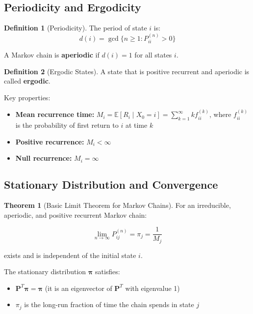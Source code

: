 \documentclass[12pt,a4paper]{article}
\theoremstyle{definition}
\newtheorem{definition}{Definition}[section]
\newtheorem{theorem}{Theorem}[section]
\begin{document}
\subsection{Periodicity and Ergodicity}

\begin{definition}[Periodicity]
The period of state $i$ is:
\[
d(i) = \gcd\{n \geq 1 : P_{ii}^{(n)} > 0\}
\]

A Markov chain is \textbf{aperiodic} if $d(i) = 1$ for all states $i$.
\end{definition}

\begin{definition}[Ergodic States]
A state that is positive recurrent and aperiodic is called \textbf{ergodic}.

Key properties:
\begin{itemize}
    \item \textbf{Mean recurrence time:} $M_i = \mathbb{E}[R_i \mid X_0 = i] = \sum_{k=1}^{\infty} k f_{ii}^{(k)}$, where $f_{ii}^{(k)}$ is the probability of first return to $i$ at time $k$
    
    \item \textbf{Positive recurrence:} $M_i < \infty$
    
    \item \textbf{Null recurrence:} $M_i = \infty$
\end{itemize}
\end{definition}

\subsection{Stationary Distribution and Convergence}

\begin{theorem}[Basic Limit Theorem for Markov Chains]
For an irreducible, aperiodic, and positive recurrent Markov chain:

\[
\lim_{n \to \infty} P_{ij}^{(n)} = \pi_j = \frac{1}{M_j}
\]

exists and is independent of the initial state $i$.

The stationary distribution $\boldsymbol{\pi}$ satisfies:
\begin{itemize}
    \item $\mathbf{P}^T \boldsymbol{\pi} = \boldsymbol{\pi}$ (it is an eigenvector of $\mathbf{P}^T$ with eigenvalue 1)
    \item $\pi_j$ is the long-run fraction of time the chain spends in state $j$
\end{itemize}
\end{theorem}
\end{document}
